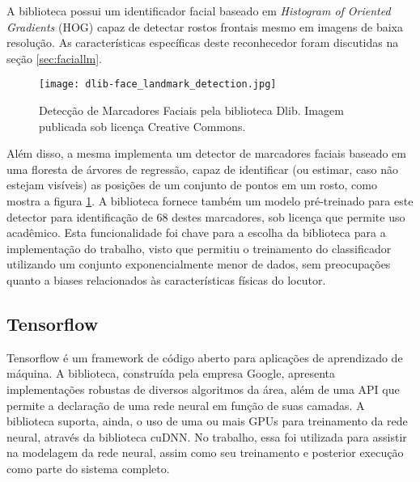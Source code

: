 A biblioteca possui um identificador facial baseado em \textit{Histogram of Oriented Gradients} (HOG) capaz de detectar rostos frontais mesmo em imagens de baixa resolução. As características específicas deste reconhecedor foram discutidas na seção \ref{sec:faciallm}.


\begin{figure}[ht]
    \centering
    \texttt{[image: dlib-face\_landmark\_detection.jpg]}    
    \caption{Detecção de Marcadores Faciais pela biblioteca Dlib. Imagem publicada sob licença Creative Commons\cite{mtheilerDeteccaoMarcadoresFaciais2019}. }
    \label{fig:dlib-landmarking}
\end{figure}

Além disso, a mesma implementa um detector de marcadores faciais baseado em uma floresta de árvores de regressão, capaz de identificar (ou estimar, caso não estejam visíveis) as posições de um conjunto de pontos em um rosto, como mostra a figura \ref{fig:dlib-landmarking}. A biblioteca fornece também um modelo pré-treinado para este detector para identificação de 68 destes marcadores, sob licença que permite uso acadêmico. Esta funcionalidade foi chave para a escolha da biblioteca para a implementação do trabalho, visto que permitiu o treinamento do classificador utilizando um conjunto exponencialmente menor de dados, sem preocupações quanto a biases relacionados às características físicas do locutor.

\subsection{Tensorflow}
\label{subsec:tf}

Tensorflow\cite{tensorflow2015-whitepaper} é um framework de código aberto para aplicações de aprendizado de máquina. A biblioteca, construída pela empresa Google, apresenta implementações robustas de diversos algoritmos da área, além de uma API que permite a declaração de uma rede neural em função de suas camadas. A biblioteca suporta, ainda, o uso de uma ou mais GPUs para treinamento da rede neural, através da biblioteca cuDNN. No trabalho, essa foi utilizada para assistir na modelagem da rede neural, assim como seu treinamento e posterior execução como parte do sistema completo.

